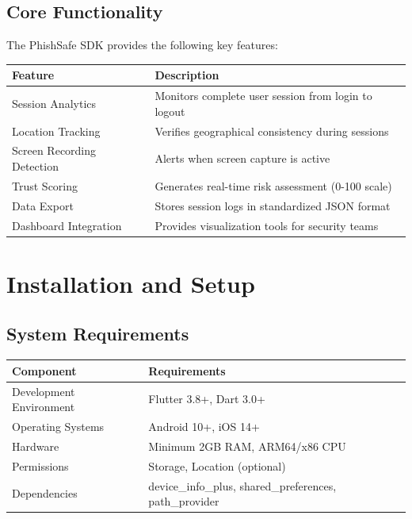 \documentclass[11pt]{article}
\begin{document}
\subsection{Core Functionality}
The PhishSafe SDK provides the following key features:

\begin{longtable}{|p{}|p{}|}
    \hline
    \textbf{Feature} & \textbf{Description} \\
    \hline
    Session Analytics\index{session analytics} & Monitors complete user session from login to logout \\
    \hline
    Location Tracking\index{location tracking} & Verifies geographical consistency during sessions \\
    \hline
    Screen Recording Detection\index{screen recording detection} & Alerts when screen capture is active \\
    \hline
    Trust Scoring & Generates real-time risk assessment (0-100 scale) \\
    \hline
    Data Export\index{data export} & Stores session logs in standardized JSON format \\
    \hline
    Dashboard Integration & Provides visualization tools for security teams \\
    \hline
\end{longtable}

\clearpage
\section{Installation and Setup}

\subsection{System Requirements}

\begin{tabularx}{\textwidth}{|l|X|}
    \hline
    \textbf{Component} & \textbf{Requirements} \\
    \hline
    Development Environment & Flutter 3.8+\index{Flutter}, Dart 3.0+\index{Dart} \\
    \hline
    Operating Systems & Android 10+\index{Android}, iOS 14+\index{iOS} \\
    \hline
    Hardware & Minimum 2GB RAM, ARM64/x86 CPU \\
    \hline
    Permissions & Storage, Location (optional) \\
    \hline
    Dependencies & device\_info\_plus, shared\_preferences, path\_provider \\
    \hline
\end{tabularx}
\end{document}
